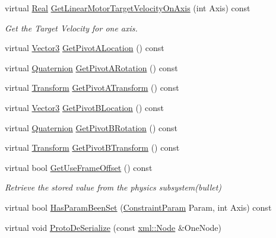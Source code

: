 \begin{DoxyCompactItemize}
virtual \hyperlink{namespacephys_af7eb897198d265b8e868f45240230d5f}{Real} \hyperlink{classphys_1_1Generic6DofConstraint_a310af828b59ffac4cde2e755d461e33d}{GetLinearMotorTargetVelocityOnAxis} (int Axis) const 
\begin{DoxyCompactList}\small\item\em Get the Target Velocity for one axis. \item\end{DoxyCompactList}\item 
virtual \hyperlink{classphys_1_1Vector3}{Vector3} \hyperlink{classphys_1_1Generic6DofConstraint_a7df9aca750e4a96d60e398ff7ac386d0}{GetPivotALocation} () const 
\item 
virtual \hyperlink{classphys_1_1Quaternion}{Quaternion} \hyperlink{classphys_1_1Generic6DofConstraint_a9e72b08fbfb91f4c7f8bec8a004b9fa4}{GetPivotARotation} () const 
\item 
virtual \hyperlink{classphys_1_1Transform}{Transform} \hyperlink{classphys_1_1Generic6DofConstraint_ade5465779dff307416a34a1a6e5271c3}{GetPivotATransform} () const 
\item 
virtual \hyperlink{classphys_1_1Vector3}{Vector3} \hyperlink{classphys_1_1Generic6DofConstraint_acdb2044cf69e520e5f55f9f9979535ef}{GetPivotBLocation} () const 
\item 
virtual \hyperlink{classphys_1_1Quaternion}{Quaternion} \hyperlink{classphys_1_1Generic6DofConstraint_a9f83234b19b56a3195d5694cbe178fff}{GetPivotBRotation} () const 
\item 
virtual \hyperlink{classphys_1_1Transform}{Transform} \hyperlink{classphys_1_1Generic6DofConstraint_abfada588a450a202891b86624a302b02}{GetPivotBTransform} () const 
\item 
virtual bool \hyperlink{classphys_1_1Generic6DofConstraint_a5300d96792882c61506e36a92fdf915c}{GetUseFrameOffset} () const 
\begin{DoxyCompactList}\small\item\em Retrieve the stored value from the physics subsystem(bullet) \item\end{DoxyCompactList}\item 
virtual bool \hyperlink{classphys_1_1Generic6DofConstraint_af877ab814c3ab3f711a6968cde9155ce}{HasParamBeenSet} (\hyperlink{namespacephys_aa1e7cf2d7efcaeaeac304f711e7564e8}{ConstraintParam} Param, int Axis) const 
\item 
virtual void \hyperlink{classphys_1_1Generic6DofConstraint_a5a065b9a671f5f48b5ee8bb6886be0e2}{ProtoDeSerialize} (const \hyperlink{classphys_1_1xml_1_1Node}{xml::Node} \&OneNode)

\end{DoxyCompactItemize}
